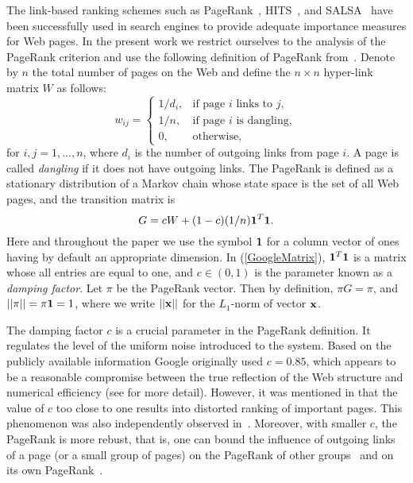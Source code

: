 \documentclass{article}
\newcommand{\one}{{\bf 1}}
\begin{document}
The link-based ranking schemes such as PageRank~\cite{Page98},
HITS~\cite{Kleinberg99}, and SALSA~\cite{Lempel00} have been
successfully used in search engines to provide adequate importance
measures for Web pages. In the present work we restrict ourselves to
the analysis of the PageRank criterion and use the following
definition of PageRank from~\cite{Langville03}. Denote by $n$ the
total number of pages on the Web and define the $n\times n$
hyper-link matrix $W$ as follows:
\begin{equation}
\label{eq:w} w_{ij} = \left\{ \begin{array}{ll}
1/d_i, & \mbox{if page $i$ links to $j$},\\
1/n, & \mbox{if page $i$ is dangling},\\
0, & \mbox{otherwise},
\end{array} \right.
\end{equation}
for $i,j=1,...,n$, where $d_i$ is the number of outgoing links from
page $i$. A page is called {\it dangling} if it does not have
outgoing links. The PageRank is defined as a stationary distribution
of a Markov chain whose state space is the set of all Web pages, and
the transition matrix is
\begin{equation}
\label{GoogleMatrix} G = cW + (1-c)(1/n)\one^T\one.
\end{equation}
Here and throughout the paper we use the
symbol $\one$ for a column vector of ones having by default an
appropriate dimension. In (\ref{GoogleMatrix}), $\one^T\one$ is a matrix whose all entries
are equal to one, and $c \in (0,1)$ is the parameter known as a {\it damping factor}. Let $\pi$ be
the PageRank vector. Then by definition, $ \pi G = \pi$, and
$||\pi||=\pi\one =1$, where we write $||{\bf x}||$ for the
$L_1$-norm of vector ${\bf x}$.

The damping factor $c$ is a crucial parameter in the PageRank
definition. It regulates the level of the uniform noise introduced
to the system. Based on the publicly available information Google
originally used $c=0.85$, which appears to be a reasonable
compromise between the true reflection of the Web structure and
numerical efficiency (see \cite{LangvilleMeyer} for more detail).
However, it was mentioned in \cite{Boldi05} that the value of $c$
too close to one results into distorted ranking of important pages.
This phenomenon was also independently observed
in~\cite{Avrachenkov06SM}. Moreover, with smaller $c$, the PageRank
is more rebust, that is, one can bound the influence of outgoing
links of a page (or a small group of pages) on the PageRank of other
groups~\cite{Bianchini05} and on its own
PageRank~\cite{Avrachenkov06SM}.
\end{document}
